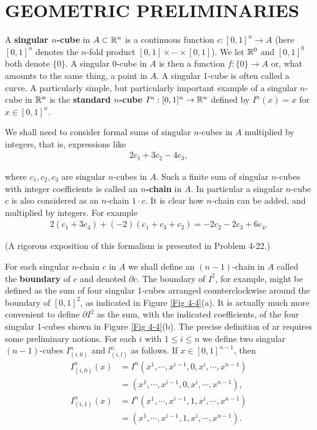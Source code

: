 \clearpage
\section[\textsc{geometric preliminaries}]{GEOMETRIC PRELIMINARIES}
A \textbf{singular $n$-cube} in $A\subset \mathbb{R}^n$ is a continuous function 
$c:[0,1]^n\to A$ (here $[0,1]^n$ denotes the $n$-fold product $[0, 1]\times\cdots\times[0,1]$).
We let $\mathbb{R}^0$ and $[0,1]^0$ both denote $\{0\}$. A singular
0-cube in $A$ is then a function $f\colon{}\{0\}\to A$ or, what amounts to
the same thing, a point in $A$. A singular 1-cube is often
called a curve. A particularly simple, but particularly
important example of a singular $n$-cube in $\mathbb{R}^n$ is the \textbf{standard $n$-cube} 
$I^n:[0,1]^n\to\mathbb{R}^n$ defined by $I^n(x) = x$ for $x\in[0,1]^n$.

We shall need to consider formal sums of singular $n$-cubes in
$A$ multiplied by integers, that is, expressions like
\begin{align*}
    2c_1 + 3c_2 - 4c_3,
\end{align*}

where $c_1,c_2,c_3$ are singular $n$-cubes in $A$. Such a finite sum of singular 
$n$-cubes with integer coefficients is called an \textbf{$n$-chain} in $A$. In particular 
a singular $n$-cube $c$ is also considered as an $n$-chain $1\cdot c$. It is clear how 
$n$-chain can be added, and multiplied by integers. For example 
\begin{align*}
    2(c_1+3c_4) + (-2)(c_1+c_3+c_2) = - 2c_2 - 2c_3 + 6c_4.
\end{align*}

(A rigorous exposition of this formalism is presented in Problem 4-22.)

For each singular $n$-chain $c$ in $A$ we shall define an $(n-1)$-chain in $A$ called the \textbf{boundary} 
of $c$ and denoted $\partial c$. The boundary of $I^2$, for example, might be defined as the sum of
four singular 1-cubes arranged counterclockwise around the boundary of $[0,1]^2$, as indicated in 
Figure \ref{Fig 4-4}(a). It is actually much more convenient to define $\partial I^2$ as the sum, with
the indicated coefficients, of the four singular 1-cubes shown in Figure \ref{Fig 4-4}(b). The precise 
definition of ar requires some preliminary notions. For each $i$ with $1 \le i\le n$ we define
two singular $(n-1)$-cubes $I^n_{(i,0)}$ and $l^n_{(i,l)}$ as follows. If $x\in[0,1]^{n-1}$, then 
\begin{align*}
    I^n_{(i,0)}(x) 
    & = I^n(x^1,\cdots,x^{i-1},0,x^i,\cdots,x^{n-1}) \\
    & = (x^1,\cdots,x^{i-1},0,x^i,\cdots,x^{n-1}),\\
    I^n_{(i,1)}(x)
    & = I^n(x^1,\cdots,x^{i-1},1,x^i,\cdots,x^{n-1}) \\
    & = (x^1,\cdots,x^{i-1},1,x^i,\cdots,x^{n-1}).
\end{align*}

